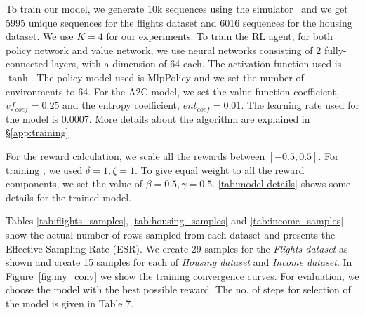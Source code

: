 
To train our model, we generate 10k sequences using the simulator~\cite{atena2020sigmod} and we get 5995 unique sequences for the flights dataset and 6016 sequences for the housing dataset. We use $K=4$ for our experiments. To train the RL agent, for both policy network and value network, we use neural networks consisting of 2 fully-connected layers, with a dimension of 64 each. The activation function used is $\tanh$. The policy model used is MlpPolicy and we set the number of environments to 64. For the A2C model, we set the value function coefficient, $vf_{coef} = 0.25$ and the entropy coefficient, $ent_{coef} = 0.01$. The learning rate used for the model is 0.0007. More details about the algorithm are explained in \S{\ref{app:training}}
 
For the reward calculation, we scale all the rewards between $[-0.5, 0.5]$. For training \name{}, we used $\delta=1, \zeta=1$. To give equal weight to all the reward components, we set the value of $\beta=0.5, \gamma=0.5$. \ref{tab:model-details} shows some details for the trained model.

Tables \ref{tab:flights_samples}, \ref{tab:housing_samples} and \ref{tab:income_samples} show the actual number of rows sampled from each dataset and presents the Effective Sampling Rate (ESR). We create 29 samples for the \textit{Flights dataset} as shown and create 15 samples for each of \textit{Housing dataset} and \textit{Income dataset}.
In Figure~\ref{fig:my_conv} we show the training convergence curves. For evaluation, we choose the model with the best possible reward. The no. of steps for selection of the model is given in Table 7.

